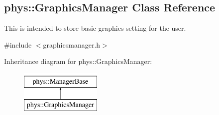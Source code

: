\hypertarget{classphys_1_1GraphicsManager}{
\subsection{phys::GraphicsManager Class Reference}
\label{classphys_1_1GraphicsManager}
}


This is intended to store basic graphics setting for the user.  




{\ttfamily \#include $<$graphicsmanager.h$>$}

Inheritance diagram for phys::GraphicsManager:\begin{figure}[H]
\begin{center}
\leavevmode
\includegraphics[height=2.000000cm]{classphys_1_1GraphicsManager}
\end{center}
\end{figure}

